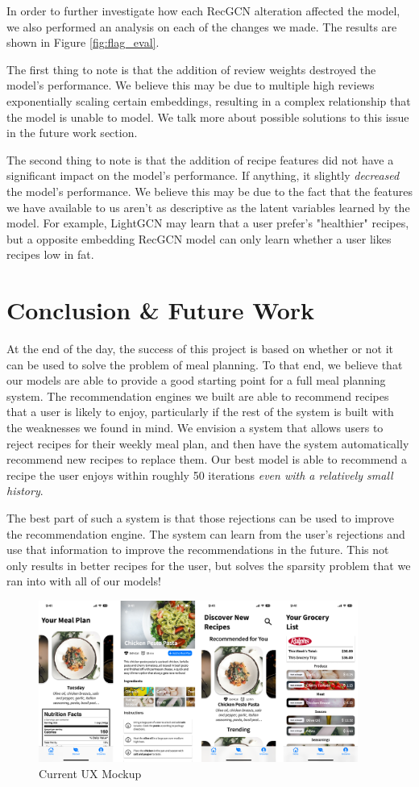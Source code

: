 \documentclass{article}
\begin{document}
In order to further investigate how each RecGCN alteration affected the model, we also performed an analysis on each of the changes we made. The results are shown in Figure \ref{fig:flag_eval}.

The first thing to note is that the addition of review weights destroyed the model's performance. We believe this may be due to multiple high reviews exponentially scaling certain embeddings, resulting in a complex relationship that the model is unable to model. We talk more about possible solutions to this issue in the future work section.

The second thing to note is that the addition of recipe features did not have a significant impact on the model's performance. If anything, it slightly \textit{decreased} the model's performance. We believe this may be due to the fact that the features we have available to us aren't as descriptive as the latent variables learned by the model. For example, LightGCN may learn that a user prefer's "healthier" recipes, but a opposite embedding RecGCN model can only learn whether a user likes recipes low in fat. 

\section{Conclusion \& Future Work}

At the end of the day, the success of this project is based on whether or not it can be used to solve the problem of meal planning. To that end, we believe that our models are able to provide a good starting point for a full meal planning system. The recommendation engines we built are able to recommend recipes that a user is likely to enjoy, particularly if the rest of the system is built with the weaknesses we found in mind. We envision a system that allows users to reject recipes for their weekly meal plan, and then have the system automatically recommend new recipes to replace them. Our best model is able to recommend a recipe the user enjoys within roughly 50 iterations \textit{even with a relatively small history}.

The best part of such a system is that those rejections can be used to improve the recommendation engine. The system can learn from the user's rejections and use that information to improve the recommendations in the future. This not only results in better recipes for the user, but solves the sparsity problem that we ran into with all of our models!

\begin{figure}[h]
  \centering
  \includegraphics[height=200px]{figures/ux.png}
  \caption{Current UX Mockup}
  \label{fig:ux}
\end{figure}
\end{document}
